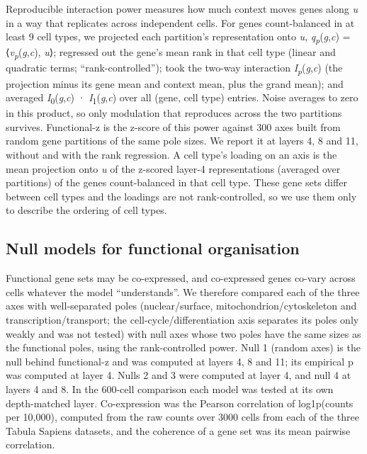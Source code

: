 \documentclass[
  11pt,
]{article}
\begin{document}
Reproducible interaction power measures how much context moves genes
along \emph{u} in a way that replicates across independent cells. For
genes count-balanced in at least 9 cell types, we projected each
partition's representation onto \emph{u},
\emph{q}\textsubscript{\emph{p}}(\emph{g},\emph{c}) =
⟨\emph{v}\textsubscript{\emph{p}}(\emph{g},\emph{c}), \emph{u}⟩;
regressed out the gene's mean rank in that cell type (linear and
quadratic terms; ``rank-controlled''); took the two-way interaction
\emph{I}\textsubscript{\emph{p}}(\emph{g},\emph{c}) (the projection
minus its gene mean and context mean, plus the grand mean); and averaged
\emph{I}\textsubscript{0}(\emph{g},\emph{c}) ·
\emph{I}\textsubscript{1}(\emph{g},\emph{c}) over all (gene, cell type)
entries. Noise averages to zero in this product, so only modulation that
reproduces across the two partitions survives. Functional-z is the
z-score of this power against 300 axes built from random gene partitions
of the same pole sizes. We report it at layers 4, 8 and 11, without and
with the rank regression. A cell type's loading on an axis is the mean
projection onto \emph{u} of the z-scored layer-4 representations
(averaged over partitions) of the genes count-balanced in that cell
type. These gene sets differ between cell types and the loadings are not
rank-controlled, so we use them only to describe the ordering of cell
types.

\subsection{Null models for functional
organisation}\label{null-models-for-functional-organisation}

Functional gene sets may be co-expressed, and co-expressed genes co-vary
across cells whatever the model ``understands''. We therefore compared
each of the three axes with well-separated poles (nuclear/surface,
mitochondrion/cytoskeleton and transcription/transport; the
cell-cycle/differentiation axis separates its poles only weakly and was
not tested) with null axes whose two poles have the same sizes as the
functional poles, using the rank-controlled power. Null 1 (random axes)
is the null behind functional-z and was computed at layers 4, 8 and 11;
its empirical p was computed at layer 4. Nulls 2 and 3 were computed at
layer 4, and null 4 at layers 4 and 8. In the 600-cell comparison each
model was tested at its own depth-matched layer. Co-expression was the
Pearson correlation of log1p(counts per 10,000), computed from the raw
counts over 3000 cells from each of the three Tabula Sapiens datasets,
and the coherence of a gene set was its mean pairwise correlation.
\end{document}
